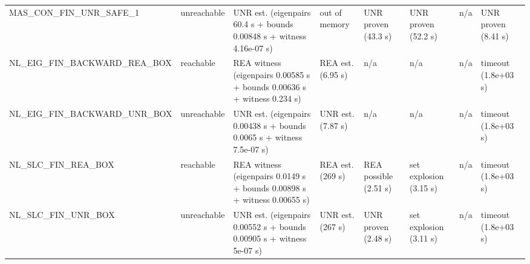 \begin{tabular}{llllllll}
MAS\_CON\_FIN\_UNR\_SAFE\_1 & unreachable & UNR est. (eigenpairs 60.4 s + bounds 0.00848 s + witness 4.16e-07 s) & out of memory & UNR proven (43.3 s) & UNR proven (52.2 s) & n/a & UNR proven (8.41 s) \\
NL\_EIG\_FIN\_BACKWARD\_REA\_BOX & reachable & REA witness (eigenpairs 0.00585 s + bounds 0.00636 s + witness 0.234 s) & REA est. (6.95 s) & n/a & n/a & n/a & timeout (1.8e+03 s) \\
NL\_EIG\_FIN\_BACKWARD\_UNR\_BOX & unreachable & UNR est. (eigenpairs 0.00438 s + bounds 0.0065 s + witness 7.5e-07 s) & UNR est. (7.87 s) & n/a & n/a & n/a & timeout (1.8e+03 s) \\
NL\_SLC\_FIN\_REA\_BOX & reachable & REA witness (eigenpairs 0.0149 s + bounds 0.00898 s + witness 0.00655 s) & REA est. (269 s) & REA possible (2.51 s) & set explosion (3.15 s) & n/a & timeout (1.8e+03 s) \\
NL\_SLC\_FIN\_UNR\_BOX & unreachable & UNR est. (eigenpairs 0.00552 s + bounds 0.00905 s + witness 5e-07 s) & UNR est. (267 s) & UNR proven (2.48 s) & set explosion (3.11 s) & n/a & timeout (1.8e+03 s) \\
\bottomrule
\end{tabular}
